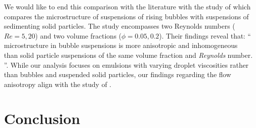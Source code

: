 \documentclass[11pt]{My_preprint}
\begin{document}
We would like to end this comparison with the literature with the study of \citet{yin2008lattice} which compares the microstructure of suspensions of rising bubbles with suspensions of sedimenting solid particles.
The study encompasses two Reynolds numbers ($Re = 5, 20$) and two volume fractions ($\phi = 0.05, 0.2$). Their findings reveal that: 
\enquote{    
     microstructure in bubble
    suspensions is more anisotropic and inhomogeneous than
    solid particle suspensions of the same volume fraction and
    \textit{Reynolds} number.    
}. 
While our analysis focuses on emulsions with varying droplet viscosities rather than bubbles and suspended solid particles, our findings regarding the flow anisotropy align with the study of \citet{yin2008lattice}. 



 
\section{Conclusion}
\label{sec:conclusion}
\end{document}
